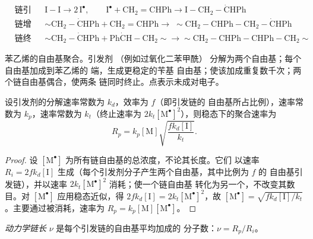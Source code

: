 \begin{omfigure}
\begin{align*}
&\text{链引发：} && \mathrm{I{-}I} \longrightarrow 2\,\mathrm{I^{\bullet}}, \qquad
\mathrm{I^{\bullet} + CH_2{=}CHPh \longrightarrow I{-}CH_2{-}\dot{C}HPh} \\
&\text{链增长：} && {\sim}\mathrm{CH_2{-}\dot{C}HPh + CH_2{=}CHPh \longrightarrow}\;
{\sim}\mathrm{CH_2{-}CHPh{-}CH_2{-}\dot{C}HPh} \\
&\text{链终止：} && {\sim}\mathrm{CH_2{-}\dot{C}HPh + Ph\dot{C}H{-}CH_2}{\sim} \longrightarrow
{\sim}\mathrm{CH_2{-}CHPh{-}CHPh{-}CH_2}{\sim}
\end{align*}

{\small 苯乙烯的自由基聚合。引发剂 （例如过氧化二苯甲酰）
分解为两个自由基；每个自由基加成到苯乙烯的  端，生成更稳定的苄基
自由基；使该加成重复数千次；两个链自由基偶合，使两条
链同时终止。点表示未成对电子。}
\end{omfigure}

\begin{theorem}[自由基聚合速率]\label{thm:b2:polymer-synthesis:radical-rate}
设引发剂的分解速率常数为 $k_d$，效率为 $f$（即引发链的
自由基所占比例），速率常数为 $k_p$，速率常数为 $k_t$（终止速率为 $2k_t
[\mathrm{M^\bullet}]^2$），则稳态下的聚合速率为
\begin{equation*}
R_p = k_p [\mathrm M] \sqrt{\frac{f k_d [\mathrm I]}{k_t}}.
\end{equation*}
\end{theorem}

\begin{proof}
设 $[\mathrm{M^\bullet}]$ 为所有链自由基的总浓度，不论其长度。它们
以速率 $R_i = 2fk_d[\mathrm I]$ 生成（每个引发剂分子产生两个自由基，其中比例为 $f$ 的
自由基引发链），并以速率 $2k_t[\mathrm{M^\bullet}]^2$ 消耗；使一个链自由基
转化为另一个，不改变其数目。对
$[\mathrm{M^\bullet}]$ 应用稳态近似，得 $2fk_d[\mathrm I] = 2k_t[\mathrm{M^\bullet}]^2$，故 $[\mathrm{M^\bullet}] =
\sqrt{fk_d[\mathrm I]/k_t}$。主要通过被消耗，速率为 $R_p =
k_p[\mathrm M][\mathrm{M^\bullet}]$。
\end{proof}

\begin{definition}[动力学链长]\label{def:b2:polymer-synthesis:chain-length}
\emph{动力学链长} $\nu$ 是每个引发链的自由基平均加成的
分子数：$\nu = R_p/R_i$。
\end{definition}

